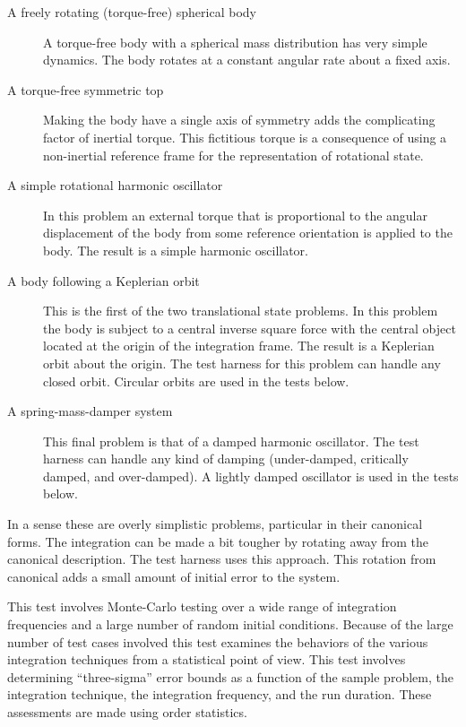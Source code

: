 \begin{description}
\begin{description}
\item[A freely rotating (torque-free) spherical body] %
  A torque-free body with a spherical mass distribution has very simple
  dynamics. The body rotates at a constant angular rate about a fixed axis.

\item[A torque-free symmetric top] %
  Making the body have a single axis of symmetry adds the complicating
  factor of inertial torque. This fictitious torque is a consequence of
  using a non-inertial reference frame for the representation of rotational
  state.
  
\item[A simple rotational harmonic oscillator] %
  In this problem an external torque that is proportional to the angular
  displacement of the body from some reference orientation is applied to
  the body. The result is a simple harmonic oscillator.

\item[A body following a Keplerian orbit] %
  This is the first of the two translational state problems.
  In this problem the body is subject to a central inverse square
  force with the central object located at the origin of the integration
  frame. The result is a Keplerian orbit about the origin.
  The test harness for this problem can handle any closed orbit.
  Circular orbits are used in the tests below.

\item[A spring-mass-damper system]
  This final problem is that of a damped harmonic oscillator.
  The test harness can handle any kind of damping (under-damped,
  critically damped, and over-damped).
  A lightly damped oscillator is used in the tests below.  
\end{description}

In a sense these are overly simplistic problems, particular in their
canonical forms. The integration can be made a bit tougher by rotating
away from the canonical description. The test harness uses this
approach. This rotation from canonical adds a small amount of initial
error to the system.


This test involves Monte-Carlo testing over a wide range of integration 
frequencies and a large number of random initial conditions. 
Because of the large number of test cases involved
this test examines the behaviors of the various
integration techniques from a statistical point of view.
This test involves determining ``three-sigma'' error bounds as a function
of the sample problem, the integration technique, the integration frequency,
and the run duration. These assessments are made using order statistics.


\end{description}
